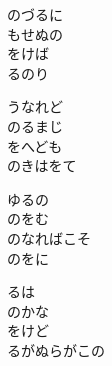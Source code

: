 \documentclass[10pt,b5j]{tarticle} %
\begin{document}
\vspace{1.5em} %
\newcommand{\linespace}{0.5em} %
\newcommand{\blocksize}{0.5\hsize} %
\begin{enumerate} %
    \begin{minipage}[c]{\blocksize}
    
        \vspace{\linespace}
        \item
        のづるに\\
        もせぬの\\
        をけば\\
        るのり
        
        \vspace{\linespace}
        \item
        うなれど\\
        のるまじ\\
        をへども\\
        のきはをて
        
        \vspace{\linespace}
        \item
        ゆるの\\
        のをむ\\
        のなればこそ\\
        のをに
        
        \vspace{\linespace}
        \item
        るは\\
        のかな\\
        をけど\\
        るがぬらがこの
    
    \end{minipage}
\end{enumerate} %
\end{document}
